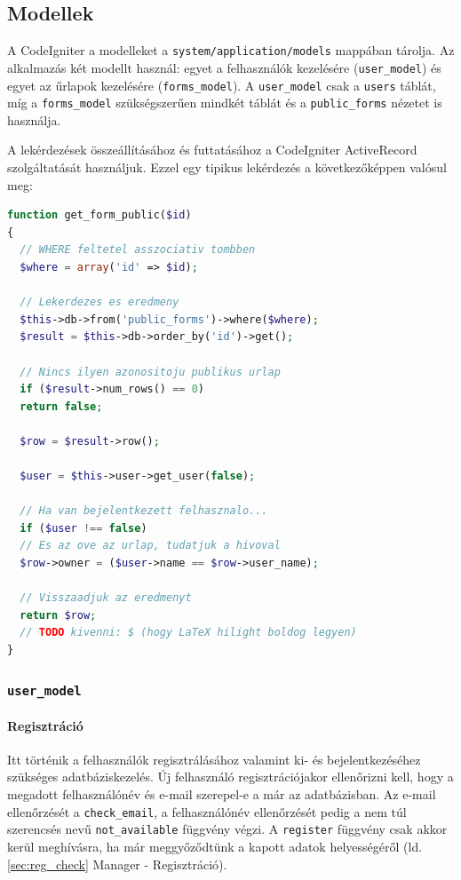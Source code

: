 \documentclass[12pt,a4paper,twoside]{article}
\begin{document}
\subsection{Modellek}

A CodeIgniter a modelleket a \texttt{system/application/models} mappában
tárolja. Az alkalmazás két modellt használ: egyet a felhasználók kezelésére
(\texttt{user\_model}) és egyet az űrlapok kezelésére (\texttt{forms\_model}). A
\texttt{user\_model} csak a \texttt{users} táblát, míg a
\texttt{forms\_model} szükségszerűen mindkét táblát és a \texttt{public\_forms}
nézetet is használja.

A lekérdezések összeállításához és futtatásához a CodeIgniter ActiveRecord
szolgáltatását használjuk. Ezzel egy tipikus lekérdezés a következőképpen
valósul meg:

\begin{lstlisting}[language=PHP]
function get_form_public($id)
{
  // WHERE feltetel asszociativ tombben
  $where = array('id' => $id);

  // Lekerdezes es eredmeny
  $this->db->from('public_forms')->where($where);
  $result = $this->db->order_by('id')->get();

  // Nincs ilyen azonositoju publikus urlap
  if ($result->num_rows() == 0)
  return false;

  $row = $result->row();

  $user = $this->user->get_user(false);

  // Ha van bejelentkezett felhasznalo...
  if ($user !== false)
  // Es az ove az urlap, tudatjuk a hivoval
  $row->owner = ($user->name == $row->user_name);

  // Visszaadjuk az eredmenyt
  return $row;
  // TODO kivenni: $ (hogy LaTeX hilight boldog legyen)
}
\end{lstlisting}

\subsubsection{\texttt{user\_model}}

\paragraph{Regisztráció}
Itt történik a felhasználók regisztrálásához valamint ki- és bejelentkezéséhez
szükséges adatbáziskezelés. Új felhasználó regisztrációjakor ellenőrizni
kell, hogy a megadott felhasználónév és e-mail szerepel-e a már az
adatbázisban. Az e-mail ellenőrzését a \texttt{check\_email}, a felhasználónév
ellenőrzését pedig a nem túl szerencsés nevű \texttt{not\_available} függvény
végzi. A \texttt{register} függvény csak akkor kerül meghívásra, ha már
meggyőződtünk a kapott adatok helyességéről (ld. \ref{sec:reg_check} Manager -
Regisztráció).
\end{document}
